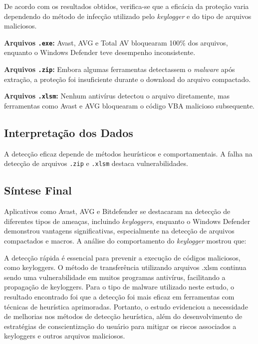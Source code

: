 \documentclass[12pt]{article}
\begin{document}
De acordo com os resultados obtidos, verifica-se que a eficácia da proteção varia dependendo do método de infecção utilizado pelo \textit{keylogger} e do tipo de arquivos maliciosos.

\noindent\textbf{Arquivos \texttt{.exe}:} Avast, AVG e Total AV bloquearam 100\% dos arquivos, enquanto o Windows Defender teve desempenho inconsistente.

\noindent\textbf{Arquivos \texttt{.zip}:} Embora algumas ferramentas detectassem o \textit{malware} após extração, a proteção foi insuficiente durante o download do arquivo compactado.

\noindent\textbf{Arquivos \texttt{.xlsm}:} Nenhum antivírus detectou o arquivo diretamente, mas ferramentas como Avast e AVG bloquearam o código VBA malicioso subsequente.

\subsection*{Interpretação dos Dados}
A detecção eficaz depende de métodos heurísticos e comportamentais. A falha na detecção de arquivos \texttt{.zip} e \texttt{.xlsm} destaca vulnerabilidades.

\subsection*{Síntese Final}
Aplicativos como Avast, AVG e Bitdefender se destacaram na detecção de diferentes tipos de ameaças, incluindo \textit{keyloggers}, enquanto o Windows Defender demonstrou vantagens significativas, especialmente na detecção de arquivos compactados e macros. A análise do comportamento do \textit{keylogger} mostrou que:

A detecção rápida é essencial para prevenir a execução de códigos maliciosos, como keyloggers. 
O método de transferência utilizando arquivos .xlsm continua sendo uma vulnerabilidade em muitos 
programas antivírus, facilitando a propagação de keyloggers. Para o tipo de malware utilizado neste 
estudo, o resultado encontrado foi que a detecção foi mais eficaz em ferramentas com técnicas de 
heurística aprimoradas. Portanto, o estudo evidenciou a necessidade de melhorias nos métodos de detecção 
heurística, além do desenvolvimento de estratégias de conscientização do usuário para mitigar os riscos associados a keyloggers e outros arquivos maliciosos.




\end{document}
